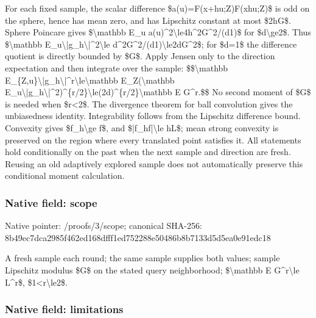 \documentclass[10pt,a4paper]{article}
\begin{document}
For each fixed sample, the scalar difference \$a(u)=F(x+hu;Z)F(xhu;Z)\$ is odd on the sphere, hence has mean zero, and has Lipschitz constant at most \$2hG\$. Sphere Poincare gives \$\textbackslash{}mathbb E\_u a(u)\textasciicircum{}2\textbackslash{}le4h\textasciicircum{}2G\textasciicircum{}2/(d1)\$ for \$d\textbackslash{}ge2\$. Thus \$\textbackslash{}mathbb E\_u\textbackslash{}|g\_h\textbackslash{}|\textasciicircum{}2\textbackslash{}le d\textasciicircum{}2G\textasciicircum{}2/(d1)\textbackslash{}le2dG\textasciicircum{}2\$; for \$d=1\$ the difference quotient is directly bounded by \$G\$. Apply Jensen only to the direction expectation and then integrate over the sample:
\$\$\textbackslash{}mathbb E\_\{Z,u\}\textbackslash{}|g\_h\textbackslash{}|\textasciicircum{}r\textbackslash{}le\textbackslash{}mathbb E\_Z(\textbackslash{}mathbb E\_u\textbackslash{}|g\_h\textbackslash{}|\textasciicircum{}2)\textasciicircum{}\{r/2\}\textbackslash{}le(2d)\textasciicircum{}\{r/2\}\textbackslash{}mathbb E G\textasciicircum{}r.\$\$
No second moment of \$G\$ is needed when \$r<2\$. The divergence theorem for ball convolution gives the unbiasedness identity. Integrability follows from the Lipschitz difference bound. Convexity gives \$f\_h\textbackslash{}ge f\$, and \$|f\_hf|\textbackslash{}le hL\$; mean strong convexity is preserved on the region where every translated point satisfies it. All statements hold conditionally on the past when the next sample and direction are fresh. Reusing an old adaptively explored sample does not automatically preserve this conditional moment calculation.


\subsubsection{Native field: scope}


Native pointer: /proofs/3/scope; canonical SHA-256: 8b49ec7dca2985f462ed168d\allowbreak{}fff1ed752288e50486b8b713\allowbreak{}3d5d5ea0e91edc18


A fresh sample each round; the same sample supplies both values; sample Lipschitz modulus \$G\$ on the stated query neighborhood; \$\textbackslash{}mathbb E G\textasciicircum{}r\textbackslash{}le L\textasciicircum{}r\$, \$1<r\textbackslash{}le2\$.


\subsubsection{Native field: limitations}
\end{document}
